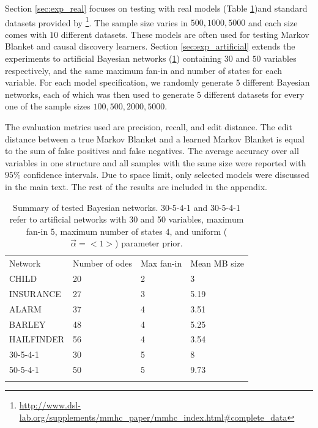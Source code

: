 \documentclass{svmult}
\begin{document}
Section \ref{sec:exp_real} focuses on testing with real models (Table \ref{tab:exp_models})and standard datasets provided by \footnote{\url{http://www.dsl-lab.org/supplements/mmhc_paper/mmhc_index.html\#complete_data}}. The sample size varies in $500, 1000, 5000$ and each size comes with $10$ different datasets. These models are often used for testing Markov Blanket and causal discovery learners.  Section \ref{sec:exp_artificial} extends the experiments to artificial Bayesian networks (\ref{tab:exp_models}) containing $30$ and $50$ variables respectively, and the same maximum fan-in and number of states for each variable. For each model specification, we randomly generate $5$ different Bayesian networks, each of which was then used to generate $5$ different datasets for every one of the sample sizes $100, 500, 2000, 5000$. 

The evaluation metrics used are precision, recall, and edit distance. The edit distance between a true Markov Blanket and a learned Markov Blanket is equal to the sum of false positives and false negatives. The average accuracy over all variables in one structure and all samples with the same size were reported with $95\%$ confidence intervals. Due to space limit, only selected models were discussed in the main text. The rest of the results are included in the appendix. 
\begin{table}
\caption{Summary of tested Bayesian networks. 30-5-4-1 and 30-5-4-1 refer to artificial networks with 30 and 50 variables, maximum fan-in 5, maximum number of states 4, and uniform ($\vec{\alpha}=<1>$) parameter prior.}
\label{tab:exp_models}       
\begin{tabular}{llll}
\hline\noalign{\smallskip}
Network    & Number of odes & Max fan-in & Mean MB size  \\
\noalign{\smallskip}\hline\noalign{\smallskip}
CHILD      & 20    & 2  &  3 \\
INSURANCE & 27    & 3  &  5.19 \\
ALARM     & 37   & 4  & 3.51 \\  
BARLEY & 48 & 4 & 5.25 \\
HAILFINDER & 56 & 4 & 3.54 \\
30-5-4-1 & 30 & 5 & 8 \\
50-5-4-1 & 50 & 5 & 9.73 \\
\noalign{\smallskip}\hline
\end{tabular}
\end{table}
\end{document}
